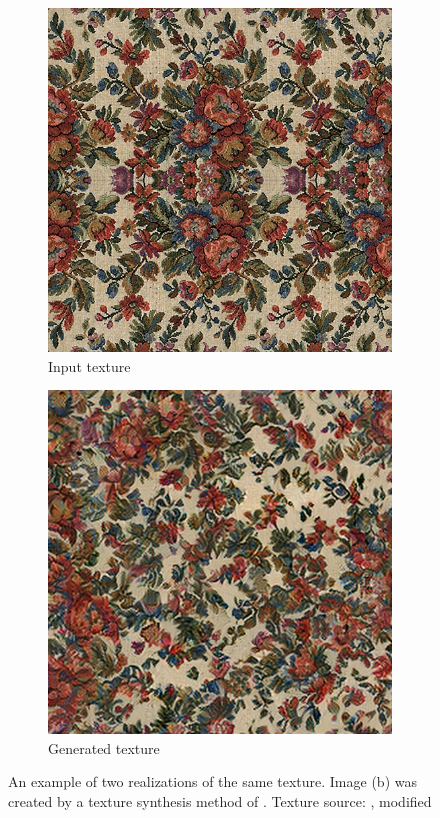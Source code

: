 \begin{figure}[ht]
    \centering
    \begin{subfigure}[b]{0.48\textwidth}
        \centering
        \includegraphics[width=\textwidth]{images/02-flowers1.jpg}
        \caption{Input texture}
    \end{subfigure}
    \hfill
    \begin{subfigure}[b]{0.48\textwidth}
        \centering
        \includegraphics[width=\textwidth]{images/02-flowers2.jpg}
        \caption{Generated texture}
    \end{subfigure}
    \caption{An example of two realizations of the same texture. Image (b) was created by a texture synthesis method of \citet{Gatys2015}. Texture source: \citet{Pixar128}, modified}
    \label{fig:background_similar_textures}
\end{figure}

